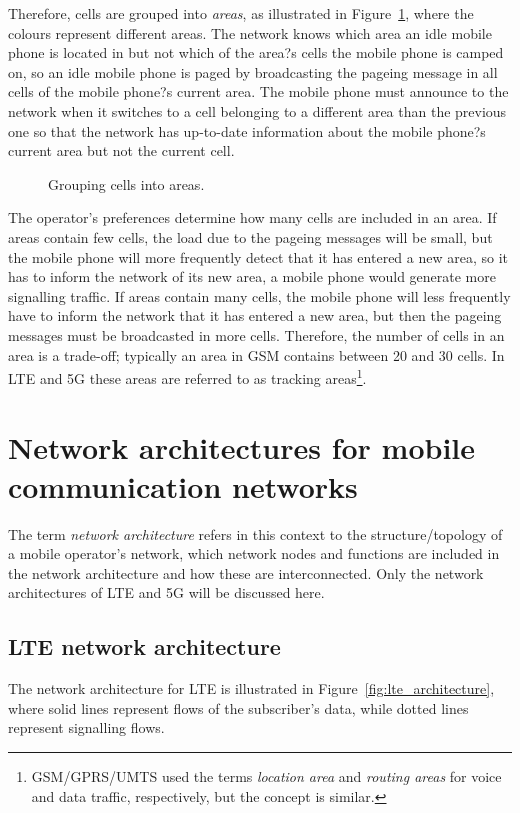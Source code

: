 Therefore, cells are grouped into \emph{areas}, as illustrated in Figure~\ref{fig:locationareas}, where the colours represent different areas. The network knows which area an idle mobile phone is located in but not which of the area?s cells the mobile phone is camped on, so an idle mobile phone is paged by broadcasting the pageing message in all cells of the mobile phone?s current area. The mobile phone must announce to the network when it switches to a cell belonging to a different area than the previous one so that the network has up-to-date information about the mobile phone?s current area but not the current cell.
\begin{figure}[htbp]
	\centering
	\caption{\label{fig:locationareas}Grouping cells into areas.}
\end{figure}

The operator's preferences determine how many cells are included in an area. If areas contain few cells, the load due to the pageing messages will be small, but the mobile phone will more frequently detect that it has entered a new area, so it has to inform the network of its new area, \ie a mobile phone would generate more signalling traffic. If areas contain many cells, the mobile phone will less frequently have to inform the network that it has entered a new area, but then the pageing messages must be broadcasted in more cells. Therefore, the number of cells in an area is a trade-off; typically an area in GSM contains between 20 and 30 cells. In LTE and 5G these areas are referred to as tracking areas\footnote{GSM/GPRS/UMTS used the terms \emph{location area} and \emph{routing areas} for voice and data traffic, respectively, but the concept is similar.}.

\section{Network architectures for mobile communication networks}
\label{sec:mobile_netarch}
The term \emph{network architecture} refers in this context to the structure/topology of a mobile operator's network, \ie which network nodes and functions are included in the network architecture and how these are interconnected. Only the network architectures of LTE and 5G will be discussed here.

\subsection{LTE network architecture}
The network architecture for LTE is illustrated in Figure~\ref{fig:lte_architecture}, where solid lines represent flows of the subscriber's data, while dotted lines represent signalling flows.

